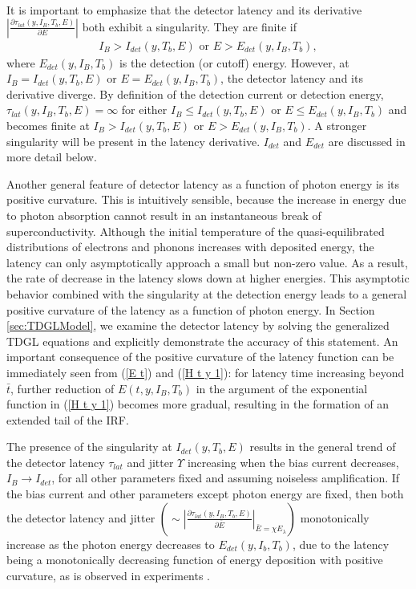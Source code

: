 \documentclass[%
reprint,
 amsmath,amssymb,
aps,
pra,
]{revtex4-1}
\begin{document}
\quad It is important to emphasize that the detector latency and its derivative 
\(\displaystyle{\left|\frac{\partial \tau_{lat}(y,I_B,T_b,E)}{\partial E}\right|}\) both exhibit a singularity.  They are finite if 
\begin{equation}\label{conditions for singularity}
\begin{aligned}
I_B > I_{det}\left(y, T_b,E\right) \text{ or } E > E_{det}\left(y,I_B ,T_b\right),
\end{aligned}
\end{equation}
where  \(E_{det}\left(y,I_B,T_b\right)\) is the detection (or cutoff) energy.  However, at \(I_B = I_{det}\left(y, T_b,E\right)\) or \(E = E_{det}\left(y,I_B,T_b\right)\), the detector latency and its derivative diverge.  By definition of the detection current or detection energy, \(\tau_{lat}(y,I_B,T_b,E)=\infty\) for either \(I_B \leq I_{det}\left(y, T_b,E\right)\) or \(E \leq E_{det}\left(y, I_B,T_b\right)\) and becomes finite at \(I_B > I_{det}\left(y, T_b,E\right)\) or \(E > E_{det}\left(y, I_B,T_b\right)\).  A stronger singularity will be present in the latency derivative. \(I_{det}\) and \(E_{det}\) are discussed in more detail below.

\quad Another general feature of detector latency as a function of photon energy is its positive curvature. This is intuitively sensible, because the increase in energy due to photon absorption cannot result in an instantaneous break of superconductivity. Although the initial temperature of the quasi-equilibrated distributions of electrons and phonons increases with deposited energy, the latency can only asymptotically approach a small but non-zero value. As a result, the rate of decrease in the latency slows down at higher energies.  This asymptotic behavior combined with the singularity at the detection energy leads to a general positive curvature of the latency as a function of photon energy.  In Section \ref{sec:TDGLModel}, we examine the detector latency by solving the generalized TDGL equations and explicitly demonstrate the accuracy of this statement.  An important consequence of the positive curvature of the latency function can be immediately seen from (\ref{E t}) and (\ref{H t y 1}): for latency time increasing beyond \(\bar{t}\), further reduction of \(E\left(t, y,I_B,T_b\right)\) in the argument of the exponential function in (\ref{H t y 1}) becomes more gradual, resulting in the formation of an extended tail of the IRF.

\quad The presence of the singularity at \(I_{det}\left(y, T_b,E\right)\) results in the general trend of the detector latency \(\tau_{lat}\) and jitter \(\Upsilon\) increasing when the bias current decreases, \(I_B \rightarrow I_{det}\), for all other parameters fixed and assuming noiseless amplification.  If the bias current and other parameters except photon energy are fixed, then both the detector latency and jitter \(\displaystyle{\left(\sim\left|\frac{\partial \tau_{lat}(y,I_B,T_b,E)}{\partial \bar{E}}\right|_{\bar{E}=\chi E_\lambda}\right)}\) monotonically increase as the photon energy decreases to \(E_{det}\left(y, I_b,T_b\right)\), due to the latency being a monotonically decreasing function of energy deposition with positive curvature, as is observed in experiments \cite{korzh_demonstrating_2018}.
\end{document}
